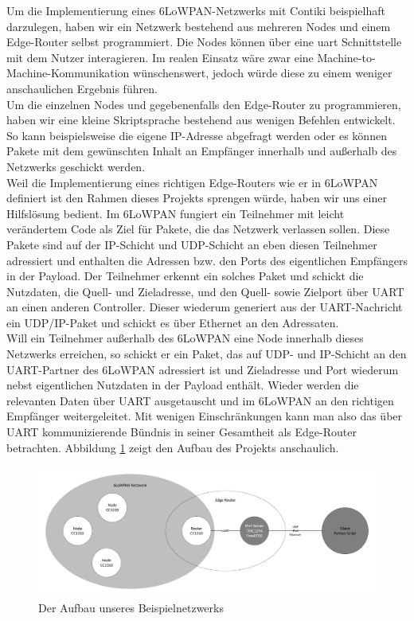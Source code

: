 Um die Implementierung eines 6LoWPAN-Netzwerks mit Contiki beispielhaft darzulegen, haben wir ein Netzwerk bestehend aus mehreren Nodes und einem Edge-Router selbst programmiert. Die Nodes können über eine \ac{uart} Schnittstelle mit dem Nutzer interagieren. Im realen Einsatz wäre zwar eine Machine-to-Machine-Kommunikation wünschenswert, jedoch würde diese zu einem weniger anschaulichen Ergebnis führen. \\
Um die einzelnen Nodes und gegebenenfalls den Edge-Router zu programmieren, haben wir eine kleine Skriptsprache bestehend aus wenigen Befehlen entwickelt. So kann beispielsweise die eigene IP-Adresse abgefragt werden oder es können Pakete mit dem gewünschten Inhalt an Empfänger innerhalb und außerhalb des Netzwerks geschickt werden. \\
Weil die Implementierung eines richtigen Edge-Routers wie er in 6LoWPAN definiert ist den Rahmen dieses Projekts sprengen würde, haben wir uns einer Hilfslösung bedient. Im 6LoWPAN fungiert ein Teilnehmer mit leicht verändertem Code als Ziel für Pakete, die das Netzwerk verlassen sollen. Diese Pakete sind auf der IP-Schicht und UDP-Schicht an eben diesen Teilnehmer adressiert und enthalten die Adressen bzw. den Ports des eigentlichen Empfängers in der Payload. Der Teilnehmer erkennt ein solches Paket und schickt die Nutzdaten, die Quell- und Zieladresse, und den Quell- sowie Zielport über UART an einen anderen Controller. Dieser wiederum generiert aus der UART-Nachricht ein UDP/IP-Paket und schickt es über Ethernet an den Adressaten.\\
Will ein Teilnehmer außerhalb des 6LoWPAN eine Node innerhalb dieses Netzwerks erreichen, so schickt er ein Paket, das auf UDP- und IP-Schicht an den UART-Partner des 6LoWPAN adressiert ist und Zieladresse und Port wiederum nebst eigentlichen Nutzdaten in der Payload enthält. Wieder werden die relevanten Daten über UART ausgetauscht und im 6LoWPAN an den richtigen Empfänger weitergeleitet. Mit wenigen Einschränkungen kann man also das über UART kommunizierende Bündnis in seiner Gesamtheit als Edge-Router betrachten. Abbildung \ref{beispielnetzwerk} zeigt den Aufbau des Projekts anschaulich.\\
\begin{figure}
	\centering
	\includegraphics[width=\textwidth]{Grafiken-Alex/beispielnetzwerk.pdf}
	\caption{Der Aufbau unseres Beispielnetzwerks}
	\label{beispielnetzwerk}
\end{figure}

